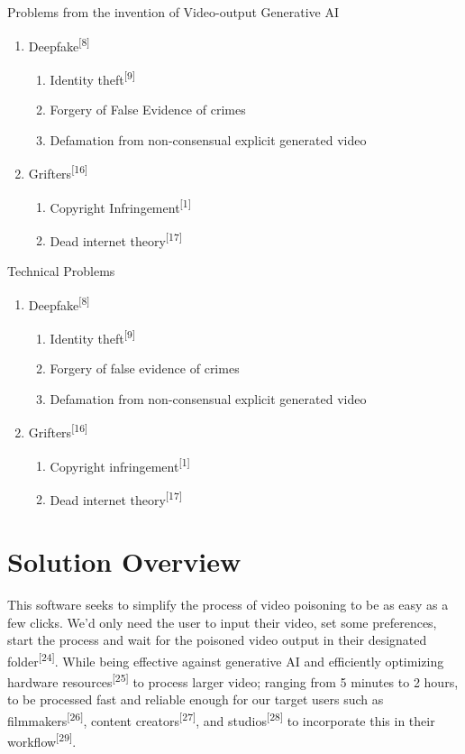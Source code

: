 Problems from the invention of Video-output Generative AI
\begin{enumerate}
    \item Deepfake\textsuperscript{[8]}
    \begin{enumerate}
        \item Identity theft\textsuperscript{[9]}
        \item Forgery of False Evidence of crimes
        \item Defamation from non-consensual explicit generated video
    \end{enumerate}
    
    \item Grifters\textsuperscript{[16]}
    \begin{enumerate}
        \item Copyright Infringement\textsuperscript{[1]}
        \item Dead internet theory\textsuperscript{[17]}
    \end{enumerate}
\end{enumerate}

Technical Problems

\begin{enumerate}
    \item Deepfake\textsuperscript{[8]}
    \begin{enumerate}
        \item Identity theft\textsuperscript{[9]}
        \item Forgery of false evidence of crimes
        \item Defamation from non-consensual explicit generated video
    \end{enumerate}
    
    \item Grifters\textsuperscript{[16]}
    \begin{enumerate}
        \item Copyright infringement\textsuperscript{[1]}
        \item Dead internet theory\textsuperscript{[17]}
    \end{enumerate}
\end{enumerate}


\section{Solution Overview}
\label{section:solution-overview}

This software seeks to simplify the process of video poisoning to be as easy as a few clicks.
We'd only need the user to input their video, set some preferences, start the process and wait for the poisoned video output in their designated folder\textsuperscript{[24]}.
While being effective against generative AI and efficiently optimizing hardware resources\textsuperscript{[25]} to process larger video; ranging from 5 minutes to 2 hours, to be processed fast and reliable enough for our target users such as filmmakers\textsuperscript{[26]}, content creators\textsuperscript{[27]}, and studios\textsuperscript{[28]} to incorporate this in their workflow\textsuperscript{[29]}.

